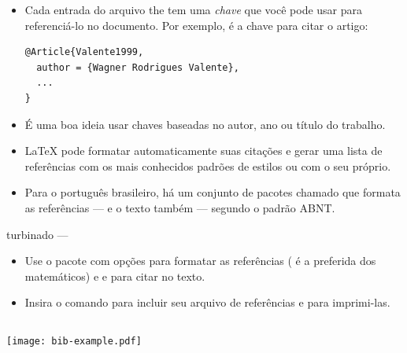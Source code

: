 \documentclass{beamer}
\begin{document}
\begin{frame}[fragile]{\insertsubsection{}}
\begin{itemize}
  \item Cada entrada do arquivo the  tem uma \emph{chave} que você pode usar para referenciá-lo no documento. Por exemplo,  é a chave para citar o artigo:
\begin{verbatim}
@Article{Valente1999,
  author = {Wagner Rodrigues Valente},
  ...
}
\end{verbatim}
  \item É uma boa ideia usar chaves baseadas no autor, ano ou título do trabalho.
  \item \LaTeX{} pode formatar automaticamente suas citações e gerar uma lista de referências com os mais conhecidos padrões de estilos ou com o seu próprio.
  \item Para o português brasileiro, há um conjunto de pacotes chamado \href{http://www.abntex.net.br/}{} que formata as referências --- e o texto também --- segundo o padrão ABNT.
\end{itemize}
\end{frame}

\begin{frame}[fragile]{\insertsubsection{} turbinado --- }
\begin{itemize}
  \item Use o pacote   com opções  para formatar as referências ( é a preferida dos matemáticos) e   e  para citar no texto.
  \item Insira o comando  para incluir seu arquivo de referências e  para imprimi-las.
\end{itemize}
\begin{minipage}{0.525\linewidth}
  \inputminted[fontsize=\tiny,frame=single,resetmargins]{latex}{bib-example.tex}
\end{minipage}
\begin{minipage}{0.4\linewidth}
  \texttt{[image: bib-example.pdf]}
\end{minipage}
\end{frame}
\end{document}
